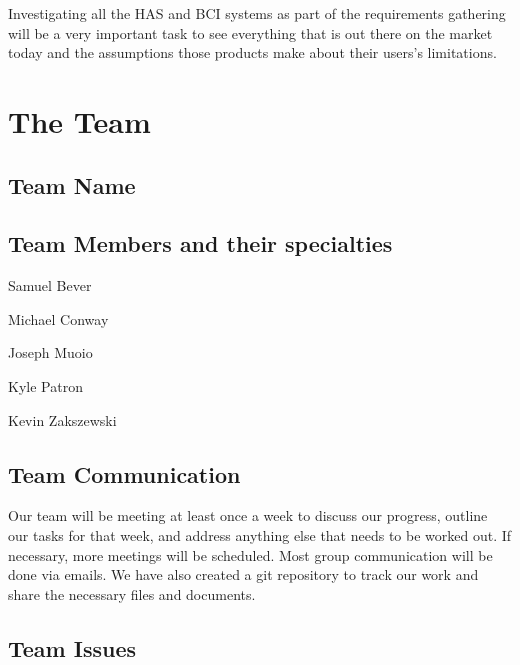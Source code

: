 \documentclass{report}
\begin{document}
Investigating all the HAS and BCI systems as part of the requirements gathering will be a very important task to see everything that is out there on the market today and the assumptions those products make about their users's limitations.

\newpage
\section*{\centering The Team}

\subsection*{Team Name}


\subsection*{Team Members and their specialties}

Samuel Bever

Michael Conway

Joseph Muoio

Kyle Patron

Kevin Zakszewski



\subsection*{Team Communication}
Our team will be meeting at least once a week to discuss our progress, outline our tasks for that week, and  address anything else that needs to be worked out. If necessary, more meetings will be scheduled. Most group communication will be done via emails. We have also created a git repository to track our work and share the necessary files and documents.

\subsection*{Team Issues}

\end{document}
